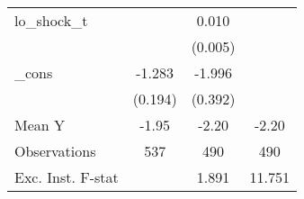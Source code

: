 {\begin{tabular}{l*{3}{c}}
\addlinespace
lo\_shock\_t  &                     &       0.010\sym{**} &                     \\
            &                     &     (0.005)         &                     \\
\addlinespace
\_cons      &      -1.283\sym{***}&      -1.996\sym{***}&                     \\
            &     (0.194)         &     (0.392)         &                     \\
\midrule
Mean Y      &       -1.95         &       -2.20         &       -2.20         \\
Observations&         537         &         490         &         490         \\
Exc. Inst. F-stat&                     &       1.891         &      11.751         \\
\bottomrule
\end{tabular}
}
